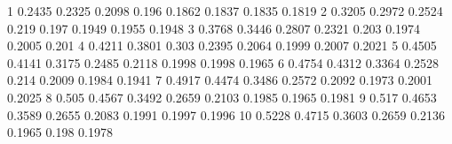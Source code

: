 1	0.2435	0.2325	0.2098	0.196	0.1862	0.1837	0.1835	0.1819
2	0.3205	0.2972	0.2524	0.219	0.197	0.1949	0.1955	0.1948
3	0.3768	0.3446	0.2807	0.2321	0.203	0.1974	0.2005	0.201
4	0.4211	0.3801	0.303	0.2395	0.2064	0.1999	0.2007	0.2021
5	0.4505	0.4141	0.3175	0.2485	0.2118	0.1998	0.1998	0.1965
6	0.4754	0.4312	0.3364	0.2528	0.214	0.2009	0.1984	0.1941
7	0.4917	0.4474	0.3486	0.2572	0.2092	0.1973	0.2001	0.2025
8	0.505	0.4567	0.3492	0.2659	0.2103	0.1985	0.1965	0.1981
9	0.517	0.4653	0.3589	0.2655	0.2083	0.1991	0.1997	0.1996
10	0.5228	0.4715	0.3603	0.2659	0.2136	0.1965	0.198	0.1978
